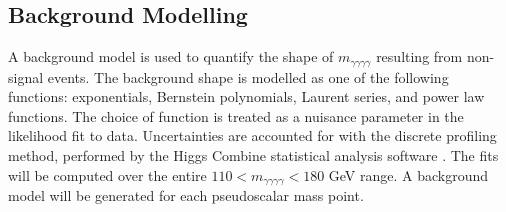 \documentclass[12pt]{article}
\begin{document}
\subsection{Background Modelling}
A background model is used to quantify the shape of $m_{\gamma\gamma\gamma\gamma}$ resulting from non-signal events. The background shape is modelled as one of the following functions: exponentials, Bernstein polynomials, Laurent series, and power law functions. The choice of function is treated as a nuisance parameter in the likelihood fit to data. Uncertainties are accounted for with the discrete profiling method, performed by the Higgs Combine statistical analysis software \cite{discrete-profiling, higgs-combine}. The fits will be computed over the entire $110 < m_{\gamma\gamma\gamma\gamma} < 180$ GeV range. A background model will be generated for each pseudoscalar mass point.\par


\end{document}
